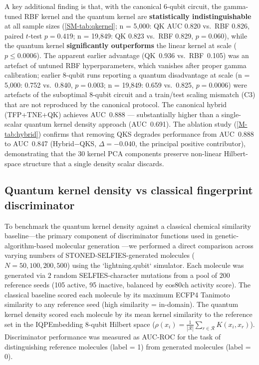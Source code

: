 \documentclass[11pt,a4paper]{article}
\begin{document}
A key additional finding is that, with the canonical 6-qubit circuit, the gamma-tuned RBF kernel and the quantum kernel are \textbf{statistically indistinguishable} at all sample sizes (\cref{SM-tab:qkernel}; n = 5,000: QK AUC 0.820 vs.~RBF 0.826, paired $t$-test $p = 0.419$; n = 19,849: QK 0.823 vs.~RBF 0.829, $p = 0.060$), while the quantum kernel \textbf{significantly outperforms} the linear kernel at scale ($p \leq 0.0006$). The apparent earlier advantage (QK~0.936 vs.~RBF~0.105) was an artefact of untuned RBF hyperparameters, which vanishes after proper gamma calibration; earlier 8-qubit runs reporting a quantum disadvantage at scale (n = 5,000: 0.752 vs.\ 0.840, $p = 0.003$; n = 19,849: 0.659 vs.\ 0.825, $p = 0.0006$) were artefacts of the suboptimal 8-qubit circuit and a train/test scaling mismatch (C3) that are not reproduced by the canonical protocol. The canonical hybrid (TFP+TNE+QK) achieves AUC~0.888 --- substantially higher than a single-scalar quantum kernel density approach (AUC~0.691). The ablation study (\cref{M-tab:hybrid}) confirms that removing QKS degrades performance from AUC~0.888 to AUC~0.847 (Hybrid$-$QKS, $\Delta = -0.040$, the principal positive contributor), demonstrating that the 30 kernel PCA components preserve non-linear Hilbert-space structure that a single density scalar discards.



\subsection{Quantum kernel density vs classical fingerprint discriminator}


To benchmark the quantum kernel density against a classical chemical similarity baseline---the primary component of discriminator functions used in genetic-algorithm-based molecular generation \citep{jensen2019augmenting}---we performed a direct comparison across varying numbers of STONED-SELFIES-generated molecules ($N = 50, 100, 200, 500$) using the `lightning.qubit` simulator. Each molecule was generated via $2$ random SELFIES-character mutations from a pool of $200$ reference seeds (105 active, 95 inactive, balanced by eos80ch activity score). The classical baseline scored each molecule by its maximum ECFP4 Tanimoto similarity to any reference seed (high similarity = in-domain). The quantum kernel density scored each molecule by its mean kernel similarity to the reference set in the IQPEmbedding 8-qubit Hilbert space ($\rho(x_i) = \frac{1}{|\mathcal{R}|}\sum_{r \in \mathcal{R}} K(x_i, x_r)$). Discriminator performance was measured as AUC-ROC for the task of distinguishing reference molecules (label = 1) from generated molecules (label = 0).
\end{document}
